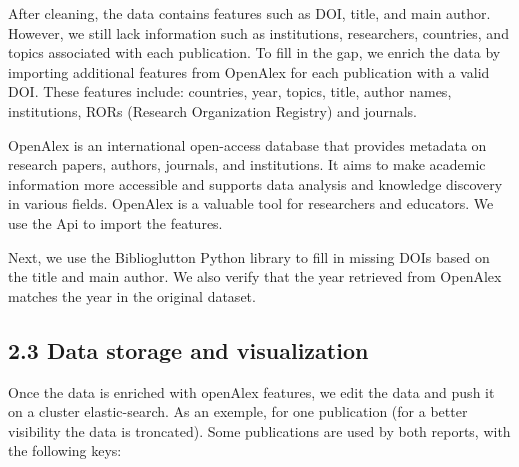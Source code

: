 \documentclass[
]{article}
\begin{document}
After cleaning, the data contains features such as DOI, title, and main
author. However, we still lack information such as institutions,
researchers, countries, and topics associated with each publication. To
fill in the gap, we enrich the data by importing additional features
from OpenAlex for each publication with a valid DOI. These features
include: countries, year, topics, title, author names, institutions,
RORs (Research Organization Registry) and journals.

OpenAlex is an international open-access database that provides metadata
on research papers, authors, journals, and institutions. It aims to make
academic information more accessible and supports data analysis and
knowledge discovery in various fields. OpenAlex is a valuable tool for
researchers and educators. We use the Api to import the features.

Next, we use the Biblioglutton Python library to fill in missing DOIs
based on the title and main author. We also verify that the year
retrieved from OpenAlex matches the year in the original dataset.

\hypertarget{data-storage-and-visualization}{%
\subsection{2.3 Data storage and
visualization}\label{data-storage-and-visualization}}

Once the data is enriched with openAlex features, we edit the data and
push it on a cluster elastic-search. As an exemple, for one publication
(for a better visibility the data is troncated). Some publications are
used by both reports, with the following keys:
\end{document}
